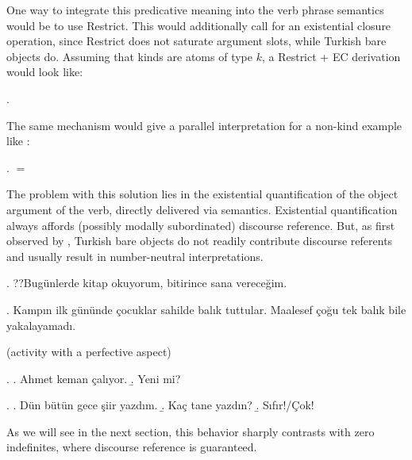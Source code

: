 \documentclass[11pt,a4paper]{article}
\begin{document}
One way to integrate this predicative meaning into the verb phrase semantics would be to use  Restrict. This would additionally call for an existential closure operation, since Restrict does not saturate argument slots, while Turkish bare objects do. Assuming that kinds are atoms of type $k$, a Restrict + EC derivation would look like:

\ex.


The same mechanism would give a parallel interpretation for a non-kind example like :

\ex.
 $=$ 


The problem with this solution lies in the existential quantification of the object argument of the verb, directly delivered via semantics. Existential quantification always affords (possibly modally subordinated) discourse reference. But, as first observed by , Turkish bare objects do not readily contribute discourse referents and usually result in number-neutral interpretations.

\ex. ??Bugünlerde kitap okuyorum, bitirince sana vereceğim.

\ex. Kampın ilk gününde çocuklar sahilde balık tuttular. Maalesef çoğu tek balık bile yakalayamadı.

(activity with a perfective aspect)


\ex.
\a. Ahmet keman çalıyor.
\b.  Yeni mi?


\ex.
\a. Dün bütün gece şiir yazdım.
\b. Kaç tane yazdın?
\b. Sıfır!/Çok!

As we will see in the next section, this behavior sharply contrasts with zero indefinites, where discourse reference is guaranteed.
\end{document}
